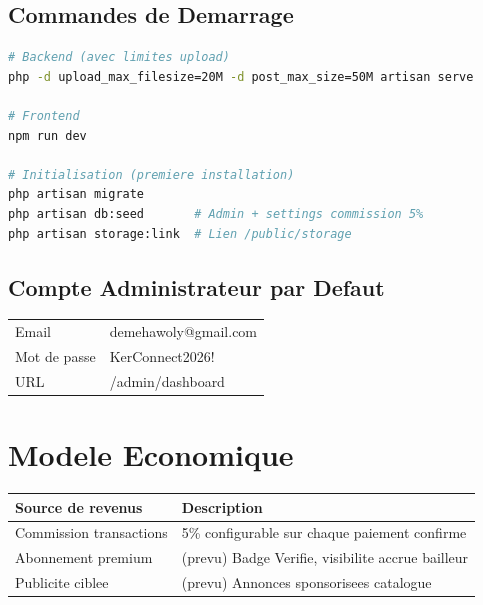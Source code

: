 \documentclass[12pt,a4paper]{article}
\begin{document}
\subsection{Commandes de Demarrage}

\begin{lstlisting}[language=bash, caption=Lancement en developpement]
# Backend (avec limites upload)
php -d upload_max_filesize=20M -d post_max_size=50M artisan serve

# Frontend
npm run dev

# Initialisation (premiere installation)
php artisan migrate
php artisan db:seed       # Admin + settings commission 5%
php artisan storage:link  # Lien /public/storage
\end{lstlisting}

\subsection{Compte Administrateur par Defaut}

\begin{center}
\begin{tabular}{|l|l|}
\hline
Email & demehawoly@gmail.com \\
Mot de passe & KerConnect2026! \\
URL & /admin/dashboard \\
\hline
\end{tabular}
\end{center}

\section{Modele Economique}

\begin{center}
\begin{tabular}{|p{4cm}|p{9cm}|}
\hline
\textbf{Source de revenus} & \textbf{Description} \\
\hline
Commission transactions & 5\% configurable sur chaque paiement confirme \\
\hline
Abonnement premium & (prevu) Badge Verifie, visibilite accrue bailleur \\
\hline
Publicite ciblee & (prevu) Annonces sponsorisees catalogue \\
\hline
\end{tabular}
\end{center}
\end{document}
